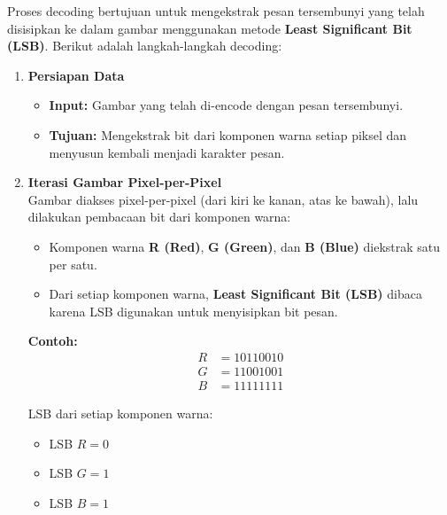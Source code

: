 \documentclass{ittelkom}
\begin{document}
\begin{enumerate}
          Proses decoding bertujuan untuk mengekstrak pesan tersembunyi yang telah
          disisipkan ke dalam gambar menggunakan metode \textbf{Least Significant Bit
              (LSB)}. Berikut adalah langkah-langkah decoding:

          \begin{enumerate}
              \item \textbf{Persiapan Data}
                    \begin{itemize}
                        \item \textbf{Input:} Gambar yang telah di-encode dengan pesan tersembunyi.
                        \item \textbf{Tujuan:} Mengekstrak bit dari komponen warna setiap piksel dan menyusun kembali menjadi karakter pesan.
                    \end{itemize}

              \item \textbf{Iterasi Gambar Pixel-per-Pixel} \\
                    Gambar diakses pixel-per-pixel (dari kiri ke kanan, atas ke bawah), lalu dilakukan pembacaan bit dari komponen warna:
                    \begin{itemize}
                        \item Komponen warna \textbf{R (Red)}, \textbf{G (Green)}, dan \textbf{B (Blue)}
                              diekstrak satu per satu.
                        \item Dari setiap komponen warna, \textbf{Least Significant Bit (LSB)} dibaca karena
                              LSB digunakan untuk menyisipkan bit pesan.
                    \end{itemize}

                    \noindent
                    \textbf{Contoh:}
                    \[
                        \begin{array}{rl}
                            R & = 10110010 \\
                            G & = 11001001 \\
                            B & = 11111111
                        \end{array}
                    \]

                    \noindent
                    LSB dari setiap komponen warna:
                    \begin{itemize}
                        \item LSB $R = 0$
                        \item LSB $G = 1$
                        \item LSB $B = 1$
                    \end{itemize}


\end{enumerate}
\end{enumerate}
\end{document}
